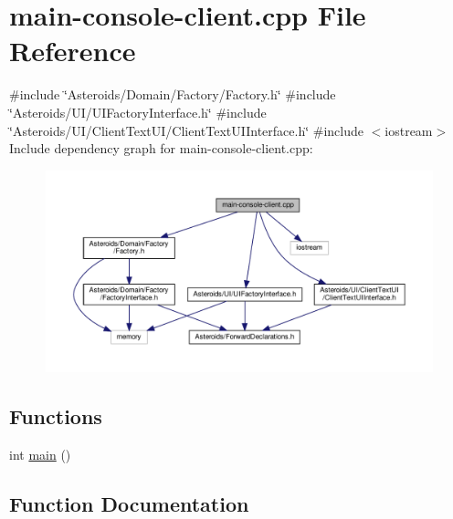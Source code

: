 \hypertarget{main-console-client_8cpp}{}\section{main-\/console-\/client.cpp File Reference}
\label{main-console-client_8cpp}
{\ttfamily \#include \char`\"{}Asteroids/\+Domain/\+Factory/\+Factory.\+h\char`\"{}}\newline
{\ttfamily \#include \char`\"{}Asteroids/\+U\+I/\+U\+I\+Factory\+Interface.\+h\char`\"{}}\newline
{\ttfamily \#include \char`\"{}Asteroids/\+U\+I/\+Client\+Text\+U\+I/\+Client\+Text\+U\+I\+Interface.\+h\char`\"{}}\newline
{\ttfamily \#include $<$iostream$>$}\newline
Include dependency graph for main-\/console-\/client.cpp\+:\nopagebreak
\begin{figure}[H]
\begin{center}
\leavevmode
\includegraphics[width=350pt]{main-console-client_8cpp__incl}
\end{center}
\end{figure}
\subsection*{Functions}
\begin{DoxyCompactItemize}
\item 
int \hyperlink{main-console-client_8cpp_ae66f6b31b5ad750f1fe042a706a4e3d4}{main} ()
\end{DoxyCompactItemize}


\subsection{Function Documentation}
\mbox{\label{main-console-client_8cpp_ae66f6b31b5ad750f1fe042a706a4e3d4}} 
